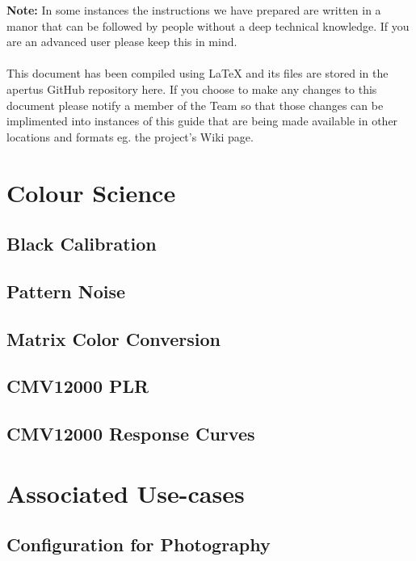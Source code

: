 \documentclass{article}
\begin{document}
\tableofcontents

\vspace*{\fill}
\textbf{Note:} In some instances the instructions we have prepared are written in a manor that can be followed by people without a deep technical knowledge. If you are an advanced user please keep this in mind.\\
\\This document has been compiled using LaTeX and its files are stored in the apertus GitHub repository here. If you choose to make any changes to this document please notify a member of the Team so that those changes can be implimented into instances of this guide that are being made available in other locations and formats eg. the project's Wiki page.













\section{Colour Science}
\subsection{Black Calibration}
\subsection{Pattern Noise}
\subsection{Matrix Color Conversion} %
\subsection{CMV12000 PLR}
\subsection{CMV12000 Response Curves}

\section{Associated Use-cases}
\subsection{Configuration for Photography}
\end{document}
